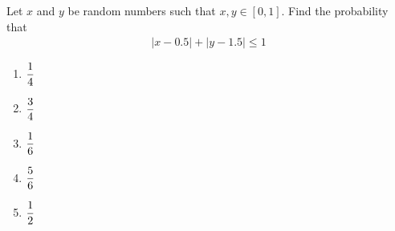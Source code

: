 Let $x$ and $y$ be random numbers such that $x,y \in [0,1]$. Find the probability that 
\begin{align*}
|x-0.5| + |y-1.5| \le 1
\end{align*}
\begin{enumerate}
\item $\displaystyle\frac{1}{4}$
\item $\displaystyle\frac{3}{4}$
\item $\displaystyle\frac{1}{6}$
\item $\displaystyle\frac{5}{6}$
\item $\displaystyle\frac{1}{2}$
\end{enumerate}
